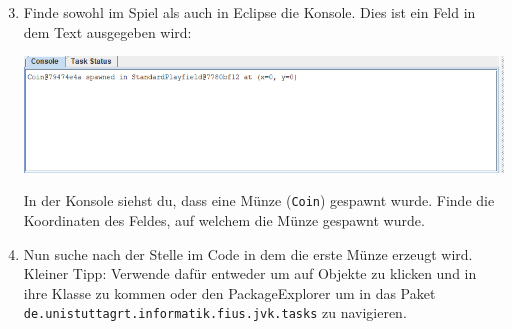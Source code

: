     \begin{enumerate}\setcounter{enumi}{2}

    \item Finde sowohl im Spiel als auch in Eclipse die Konsole. Dies ist ein Feld in dem Text ausgegeben wird:
    \begin{center}
        \includegraphics[width=\linewidth]{./figures/console.PNG}
    \end{center}

    In der Konsole siehst du, dass eine Münze (\texttt{Coin}) gespawnt wurde. Finde die Koordinaten des Feldes, auf welchem die Münze gespawnt wurde.

    \item Nun suche nach der Stelle im Code in dem die erste Münze erzeugt wird. Kleiner Tipp: Verwende dafür  entweder  um auf Objekte zu klicken und in ihre Klasse zu kommen oder den PackageExplorer um in das Paket \texttt{de.unistuttagrt.informatik.fius.jvk.tasks} zu navigieren.
\end{enumerate}
